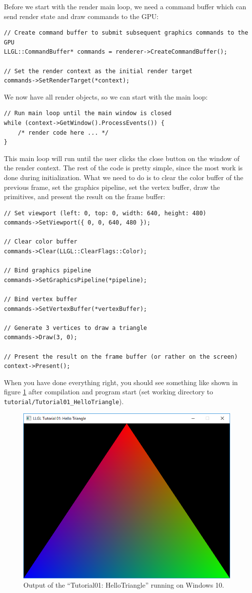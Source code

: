 \documentclass{article}
\begin{document}
Before we start with the render main loop, we need a command buffer which can send render state and draw commands to the GPU:
\begin{lstlisting}
// Create command buffer to submit subsequent graphics commands to the GPU
LLGL::CommandBuffer* commands = renderer->CreateCommandBuffer();

// Set the render context as the initial render target
commands->SetRenderTarget(*context);
\end{lstlisting}
We now have all render objects, so we can start with the main loop:
\begin{lstlisting}
// Run main loop until the main window is closed
while (context->GetWindow().ProcessEvents()) {
    /* render code here ... */
}
\end{lstlisting}
This main loop will run until the user clicks the close button on the window of the render context.
The rest of the code is pretty simple, since the most work is done during initialization.
What we need to do is to clear the color buffer of the previous frame,
set the graphics pipeline, set the vertex buffer, draw the primitives, and present the result on the frame buffer:
\begin{lstlisting}
// Set viewport (left: 0, top: 0, width: 640, height: 480)
commands->SetViewport({ 0, 0, 640, 480 });

// Clear color buffer
commands->Clear(LLGL::ClearFlags::Color);

// Bind graphics pipeline
commands->SetGraphicsPipeline(*pipeline);

// Bind vertex buffer
commands->SetVertexBuffer(*vertexBuffer);

// Generate 3 vertices to draw a triangle
commands->Draw(3, 0);

// Present the result on the frame buffer (or rather on the screen)
context->Present();
\end{lstlisting}
When you have done everything right, you should see something like shown in figure \ref{fig:tut01_mask1} after compilation
and program start (set working directory to \texttt{tutorial/Tutorial01\_HelloTriangle}).
\begin{figure}[H]
	\centering
	\includegraphics[width=0.8 \textwidth]{tut01_mask1a}
	\caption{Output of the ``Tutorial01: HelloTriangle'' running on Windows 10.}
	\label{fig:tut01_mask1}
\end{figure}
\end{document}
